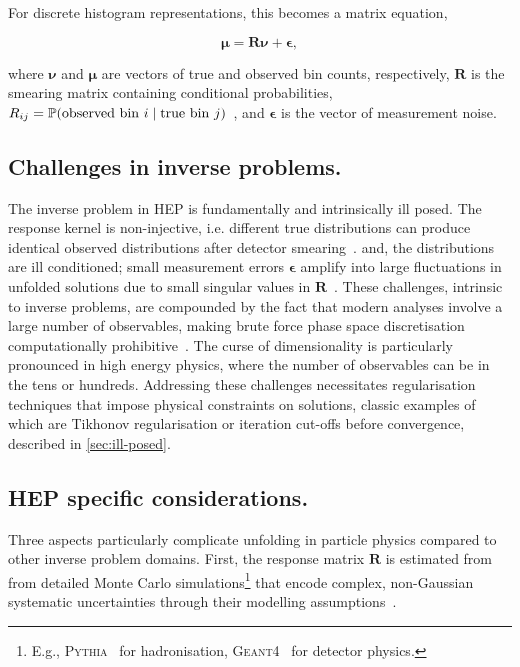 For discrete histogram representations, this becomes a matrix equation,

\begin{equation}
    \label{eq:forward-binned}
    \boldsymbol{\mu} = \mathbf{R}\boldsymbol{\nu} + \boldsymbol{\epsilon},
\end{equation}

where \(\boldsymbol{\nu}\) and \(\boldsymbol{\mu}\) are vectors of true and observed bin counts, respectively, \(\mathbf{R}\) is the smearing matrix containing conditional probabilities, \(R_{ij} = \P(\text{observed bin } i \mid \text{true bin } j)\)~\cite{cms_collaboration_measurement_2011}, and \(\boldsymbol{\epsilon}\) is the vector of measurement noise.

    \subsection{Challenges in inverse problems.}
        The inverse problem in HEP is fundamentally and intrinsically ill posed.
        The response kernel is non-injective, i.e. different true distributions can produce identical observed distributions after detector smearing~\cite{palumbo_convergence_2025, neumaier_solving_1998, weinberg_elementary_1963}.
        and, the distributions are ill conditioned; small measurement errors \(\boldsymbol{\epsilon}\) amplify into large fluctuations in unfolded solutions due to small singular values in \(\mathbf{R}\)~\cite{ChungA, fernandez-martinez_effect_2014, carpio_inverse_2008}.
        These challenges, intrinsic to inverse problems, are compounded by the fact that modern analyses involve a large number of observables, making brute force phase space discretisation computationally prohibitive~\cite{arratia_optimizing_2022, gaponenko_practical_2020, chan_unbinned_2023}.
        The curse of dimensionality is particularly pronounced in high energy physics, where the number of observables can be in the tens or hundreds.
        Addressing these challenges necessitates regularisation techniques that impose physical constraints on solutions, classic examples of which are Tikhonov regularisation or iteration cut-offs before convergence, described in \cref{sec:ill-posed}.

    \subsection{HEP specific considerations.}
        Three aspects particularly complicate unfolding in particle physics compared to other inverse problem domains.
        First, the response matrix \(\mathbf{R}\) is estimated from from detailed Monte Carlo simulations\footnote{E.g., \textsc{Pythia}~\cite{bierlich_comprehensive_2022} for hadronisation, \textsc{Geant4}~\cite{allison_recent_2016} for detector physics.} that encode complex, non-Gaussian systematic uncertainties through their modelling assumptions~\cite{bozson_unfolding_2018, schmitt_data_2017, blobel_unfolding_2011, Huang2025MachineTechnique}.


